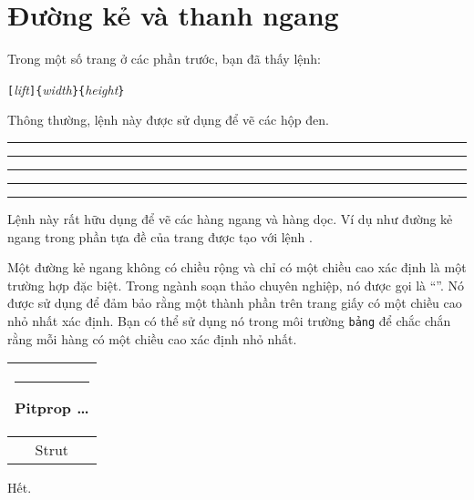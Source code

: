 \section{Đường kẻ và thanh ngang}
\label{sec:rule} Trong một số trang ở các phần trước, bạn đã thấy
lệnh:

\begin{lscommand}
\verb|[|\emph{lift}\verb|]{|\emph{width}\verb|}{|\emph{height}\verb|}|
\end{lscommand}

\noindent Thông thường, lệnh này được sử dụng để vẽ các hộp đen.
\newpage
\begin{example}
\rule{3mm}{.1pt}%
\rule[-1mm]{5mm}{1cm}%
\rule{3mm}{.1pt}%
\rule[1mm]{1cm}{5mm}%
\rule{3mm}{.1pt}
\end{example}

\noindent Lệnh này rất hữu dụng để vẽ các hàng ngang và hàng dọc.
Ví dụ như đường kẻ ngang trong phần tựa đề của trang được tạo với
lệnh .

Một đường kẻ ngang không có chiều rộng và chỉ có một chiều cao xác
định là một trường hợp đặc biệt. Trong ngành soạn thảo chuyên
nghiệp, nó được gọi là ``''. Nó được sử dụng để đảm bảo
rằng một thành phần trên trang giấy có một chiều cao nhỏ nhất xác
định. Bạn có thể sử dụng nó trong môi trường \texttt{bảng} để chắc
chắn rằng mỗi hàng có một chiều cao xác định nhỏ nhất.

\begin{example}
\begin{tabular}{|c|}
\hline
\rule{1pt}{4ex}Pitprop \ldots\\
\hline
\rule{0pt}{4ex}Strut\\
\hline
\end{tabular}
\end{example}

\bigskip
{\flushright Hết.\par}

%
